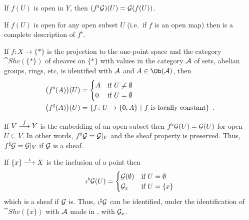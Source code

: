 \documentclass[a4paper,parskip=half,numbers=enddot, DIV=12]{scrreprt}
\begin{document}
    \begin{example}
        \begin{alphanumerate}
          \item 
            If $f(U)$ is open in $Y$, then $(f^\flat\mathcal{G})(U) = \mathcal{G}(f(U))$.
          \item 
            If $f(U)$ is open for any open subset $U$ (i.e.\ if $f$ is an open map) then  is a complete description of $f^\flat$.
          \item 
            If $f\colon X\to \{*\}$ is the projection to the one-point space and the category $\cat{Shv}(\{*\})$ of sheaves on $\{*\}$ with values in the category $\mathcal{A}$ of sets, abelian groups, rings, etc, is identified with $\mathcal{A}$ and $A\in\Ob(\Aa)$, then 
            \begin{align*}
                \big(f^\flat(A)\big)(U) &= \begin{cases} A &\text{if }U\neq\emptyset\\ 0 &\text{if } U= \emptyset \end{cases}\\
                \big(f^\sharp(A)\big)(U) &= \left\{f\colon U \to \{0,A\}\ \middle|\  f \text{ is locally constant}\right\}\;.
            \end{align*}
          \item 
            If $V\morphism[f] Y$ is the embedding of an open subset then $f^\flat \mathcal{G}(U) = \mathcal{G}(U)$ for open $U\subseteq V$. In other words, $f^\flat \mathcal{G} = \mathcal{G}|_V$ and the sheaf property is preserved. Thus, $f^\sharp \mathcal{G} = \mathcal{G}|_V$ if $\mathcal{G}$ is a sheaf.
          \item 
            If $\{x\} \morphism[\iota] X$ is the inclusion of a point then 
            \begin{align*}
                \iota^\flat\mathcal{G}(U) = \begin{cases} \mathcal{G}(\emptyset) & \text{if }U = \emptyset \\ \mathcal{G}_x&\text{if }U = \{x\}\end{cases}
            \end{align*}
            which is a sheaf if $\mathcal{G}$ is. Thus, $\iota^\sharp\mathcal{G}$ can be identified, under the identification of $\cat{Shv}(\{x\})$ with $\mathcal{A}$ made in , with $\mathcal{G}_x$.
        \end{alphanumerate}
    \end{example}
\end{document}
